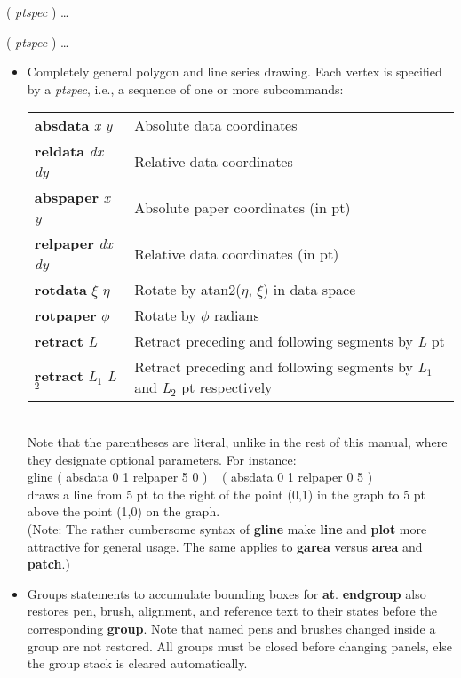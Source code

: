 \documentclass[11pt]{article}
\def\cmd#1#2{\noindent {\bf #1} #2\par}
\def\expl#1{\kern-8pt\begin{itemize}\item[]#1\end{itemize}}
\def\cref#1{{\bf #1}}
\begin{document}
\cmd{garea}{( \emph{ptspec} ) \ldots}
\cmd{gline}{( \emph{ptspec} ) \ldots}
\expl{Completely general polygon and line series drawing. 
  Each vertex is specified by a \emph{ptspec}, i.e., a sequence of one or
  more subcommands:\medskip\\
\mbox{}\kern10pt\begin{tabular}{lp{3.8in}}
{\bf absdata} \emph{x} \emph{y} & Absolute data coordinates \\
{\bf reldata} \emph{dx} \emph{dy} & Relative data coordinates \\
{\bf abspaper} \emph{x} \emph{y} & Absolute paper coordinates (in pt)\\
{\bf relpaper} \emph{dx} \emph{dy} & Relative data coordinates (in
               pt)\\
{\bf rotdata} $\xi$ $\eta$ & Rotate by atan2($\eta$, $\xi$) 
              in data space \\
{\bf rotpaper} $\phi$ & Rotate by $\phi$ radians \\
{\bf retract} \emph{L} & Retract preceding and following segments by
              \emph{L} pt \\
{\bf retract} \emph{L$_1$} \emph{L$_2$} & Retract preceding and following
              segments by \emph{L$_1$} and \emph{L$_2$} pt respectively \\
\end{tabular}\medskip\\
Note that the parentheses are literal, unlike in the rest of this manual, where
they designate optional parameters. For instance:\medskip\\
\mbox{}\kern15pt
       gline ( absdata 0 1 relpaper 5 0 ) ~ ( absdata 0 1 relpaper 0 5 )
\medskip\\
     draws a line from 5 pt to the right of the point (0,1) in the graph to
     5 pt above the point (1,0) on the graph.\\
(Note: The rather cumbersome syntax of \cref{gline} make \cref{line}
     and \cref{plot} more attractive for general usage. The same
     applies to \cref{garea} versus \cref{area} and \cref{patch}.)
}


\cmd{group}{}
\cmd{endgroup}{}
\expl{Groups statements to accumulate bounding boxes for
  \cref{at}. \cref{endgroup} also restores pen, brush, alignment, and
  reference text to their states before the corresponding
  \cref{group}. Note that named pens and brushes changed inside a
  group are not restored. All groups must be closed before changing
  panels, else the group stack is cleared automatically. }
\end{document}
